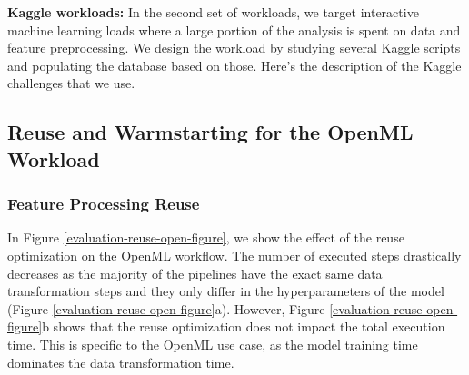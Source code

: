 \textbf{Kaggle workloads:} In the second set of workloads, we target interactive machine learning loads where a large portion of the analysis is spent on data and feature preprocessing.
We design the workload by studying several Kaggle scripts and populating the database based on those.
Here's the description of the Kaggle challenges that we use.

\subsection{Reuse and Warmstarting for the OpenML Workload}
\subsubsection{Feature Processing Reuse}  
In Figure \ref{evaluation-reuse-open-figure}, we show the effect of the reuse optimization on the OpenML workflow.
The number of executed steps drastically decreases as the majority of the pipelines have the exact same data transformation steps and they only differ in the hyperparameters of the model (Figure \ref{evaluation-reuse-open-figure}a).
However, Figure \ref{evaluation-reuse-open-figure}b shows that the reuse optimization does not impact the total execution time.
This is specific to the OpenML use case, as the model training time dominates the data transformation time.

